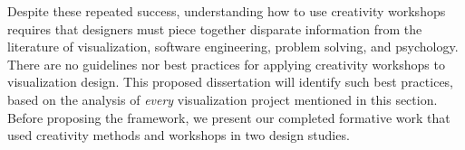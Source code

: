 Despite these repeated success, understanding how to use creativity workshops requires that designers must piece together disparate information from the literature of visualization, software engineering, problem solving, and psychology. There are no guidelines nor best practices for applying creativity workshops to visualization design. This proposed dissertation will identify such best practices, based on the analysis of \emph{every} visualization project mentioned in this section. Before proposing the framework, we present our completed formative work that used creativity methods and workshops in two design studies.